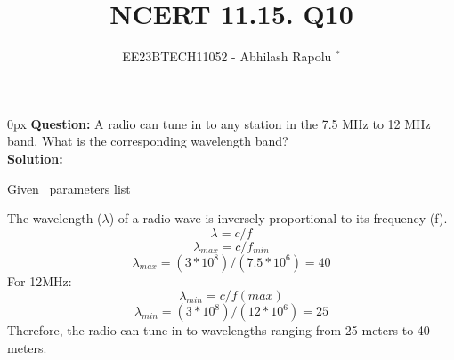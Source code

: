 \documentclass[journal,12pt,twocolumn]{IEEEtran}
\begin{document}

\vspace{3cm}
\title{NCERT 11.15. Q10}
\author{EE23BTECH11052 - Abhilash Rapolu $^{*}$%
}
\maketitle
\newpage
\bigskip
\renewcommand{\thetable}{\arabic{table}}

\parindent 0px
\textbf{Question:} A radio can tune in to any station in the 7.5 MHz to 12 MHz band.
 What is the corresponding wavelength band? \\
\textbf{Solution:}  
\begin{table}[htbp] \small
\centering

\caption{Given \, parameters list}\end{table}
The wavelength ($\lambda$) of a radio wave is inversely proportional to its frequency (f).
\bgroup \obeylines
$$\lambda=c/f$$
$$\lambda_{max}=c/f_{min}$$
\egroup
\begin{equation}
\lambda_{max}=(3*10^{8})/(7.5*10^{6})=40
\end{equation}
For 12MHz:
$$\lambda_{min}=c/f(max)$$
\begin{equation}
\lambda_{min}=(3*10^{8})/(12*10^{6})=25
\end{equation}
Therefore, the radio can tune in to wavelengths ranging from 25 meters to 40 meters.
\end{document}
